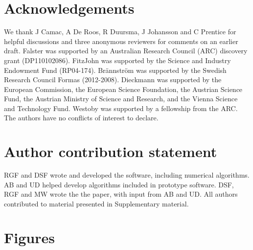 \documentclass[a4paper,11pt]{article}
\begin{document}
\section{Acknowledgements}

We thank J Camac, A De Roos, R Duursma, J Johansson and C Prentice for helpful
discussions and three anonymous reviewers for comments on an earlier draft. Falster
was supported by an Australian Research Council (ARC) discovery grant (DP110102086).
FitzJohn was supported by the Science and Industry Endowment Fund (RP04-174).
Br{\"a}nnstr{\"o}m was supported by the Swedish Research Council Formas (2012-2008).
Dieckmann was supported by the European Commission, the European Science Foundation,
the Austrian Science Fund, the Austrian Ministry of Science and Research, and the
Vienna Science and Technology Fund. Westoby was supported by a fellowship from the ARC.
The authors have no conflicts of interest to declare.

\section{Author contribution statement}

RGF and DSF wrote and developed the software, including numerical algorithms. AB and UD helped develop algorithms included in prototype software. DSF, RGF and MW wrote the the paper, with input from AB and UD. All authors contributed to material presented in Supplementary material.

\clearpage


\clearpage

\section{Figures}\label{figures}
\end{document}
